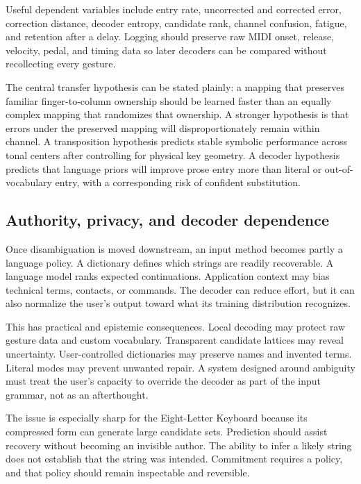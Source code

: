 \documentclass[11pt]{article}
\begin{document}
Useful dependent variables include entry rate, uncorrected and corrected error, correction distance, decoder entropy, candidate rank, channel confusion, fatigue, and retention after a delay. Logging should preserve raw MIDI onset, release, velocity, pedal, and timing data so later decoders can be compared without recollecting every gesture.

The central transfer hypothesis can be stated plainly: a mapping that preserves familiar finger-to-column ownership should be learned faster than an equally complex mapping that randomizes that ownership. A stronger hypothesis is that errors under the preserved mapping will disproportionately remain within channel. A transposition hypothesis predicts stable symbolic performance across tonal centers after controlling for physical key geometry. A decoder hypothesis predicts that language priors will improve prose entry more than literal or out-of-vocabulary entry, with a corresponding risk of confident substitution.

\subsection{Authority, privacy, and decoder dependence}

Once disambiguation is moved downstream, an input method becomes partly a language policy. A dictionary defines which strings are readily recoverable. A language model ranks expected continuations. Application context may bias technical terms, contacts, or commands. The decoder can reduce effort, but it can also normalize the user's output toward what its training distribution recognizes.

This has practical and epistemic consequences. Local decoding may protect raw gesture data and custom vocabulary. Transparent candidate lattices may reveal uncertainty. User-controlled dictionaries may preserve names and invented terms. Literal modes may prevent unwanted repair. A system designed around ambiguity must treat the user's capacity to override the decoder as part of the input grammar, not as an afterthought.

The issue is especially sharp for the Eight-Letter Keyboard because its compressed form can generate large candidate sets. Prediction should assist recovery without becoming an invisible author. The ability to infer a likely string does not establish that the string was intended. Commitment requires a policy, and that policy should remain inspectable and reversible.
\end{document}
